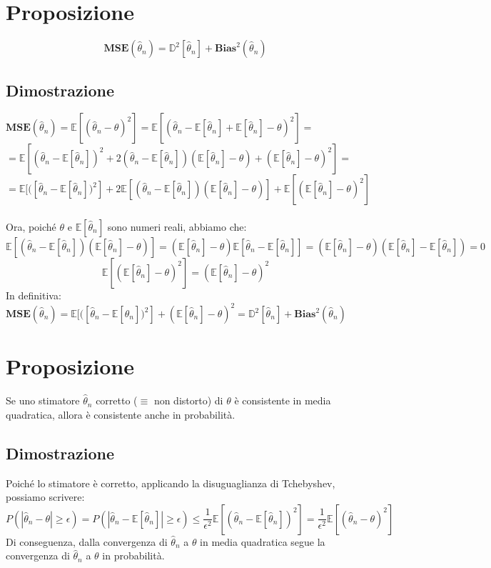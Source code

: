 \documentclass{article}
\begin{document}
\section*{Proposizione}
\[ \textbf{MSE}(\hat{\theta}_{n}) = \mathbb{D}^{2}[\hat{\theta}_{n}] + \textbf{Bias}^{2}(\hat{\theta}_{n}) \]

\subsection*{Dimostrazione}
$\textbf{MSE}(\hat{\theta}_{n}) = \mathbb{E}[(\hat{\theta}_{n} - \theta)^{2}] = \mathbb{E}[(\hat{\theta}_{n} - \mathbb{E}[\hat{\theta}_{n}] + \mathbb{E}[\hat{\theta}_{n}] - \theta)^{2}] =$\\
$=\mathbb{E}[(\hat{\theta}_{n} - \mathbb{E}[\hat{\theta}_{n}])^{2} + 2(\hat{\theta}_{n} - \mathbb{E}[\hat{\theta}_{n}])(\mathbb{E}[\hat{\theta}_{n}] - \theta) + (\mathbb{E}[\hat{\theta}_{n}] - \theta)^{2}] =$\\
$=\mathbb{E}[([\hat{\theta}_{n} - \mathbb{E}[\hat{\theta}_{n}])^{2}] + 2\mathbb{E}[(\hat{\theta}_{n} - \mathbb{E}[\hat{\theta}_{n}])(\mathbb{E}[\hat{\theta}_{n}] - \theta)] + \mathbb{E}[(\mathbb{E}[\hat{\theta}_{n}] - \theta)^{2}]$\\
\\
Ora, poiché $\theta$ e $\mathbb{E}[\hat{\theta}_{n}]$ sono numeri reali, abbiamo che:
\[ \mathbb{E}[(\hat{\theta}_{n} - \mathbb{E}[\hat{\theta}_{n}])(\mathbb{E}[\hat{\theta}_{n}] - \theta)] = (\mathbb{E}[\hat{\theta}_{n}] - \theta)\mathbb{E}[\hat{\theta}_{n} - \mathbb{E}[\hat{\theta}_{n}]] = (\mathbb{E}[\hat{\theta}_{n}] - \theta)(\mathbb{E}[\hat{\theta}_{n}] - \mathbb{E}[\hat{\theta}_{n}]) = 0 \]
\[ \mathbb{E}[(\mathbb{E}[\hat{\theta}_{n}] - \theta)^{2}] = (\mathbb{E}[\hat{\theta}_{n}] - \theta)^{2} \]
In definitiva:\\
$\textbf{MSE}(\hat{\theta}_{n}) = \mathbb{E}[([\hat{\theta}_{n} - \mathbb{E}[\hat{\theta}_{n}])^{2}] + (\mathbb{E}[\hat{\theta}_{n}] - \theta)^{2} = \mathbb{D}^{2}[\hat{\theta}_{n}] + \textbf{Bias}^{2}(\hat{\theta}_{n})$

\section*{Proposizione}
Se uno stimatore $\hat{\theta}_{n}$ corretto ($\equiv$ non distorto) di $\theta$ è consistente in media quadratica, allora è consistente anche in probabilità.

\subsection*{Dimostrazione}
Poiché lo stimatore è corretto, applicando la disuguaglianza di Tchebyshev, possiamo scrivere:
\[ P(|\hat{\theta}_{n} - \theta| \geq \epsilon) = P(|\hat{\theta}_{n} - \mathbb{E}[\hat{\theta}_{n}]| \geq \epsilon) \leq \frac{1}{\epsilon^{2}}\mathbb{E}[(\hat{\theta}_{n} - \mathbb{E}[\hat{\theta}_{n}])^{2}] = \frac{1}{\epsilon^{2}}\mathbb{E}[(\hat{\theta}_{n} - \theta)^{2}] \]
Di conseguenza, dalla convergenza di $\hat{\theta}_{n}$ a $\theta$ in media quadratica segue la convergenza di $\hat{\theta}_{n}$ a $\theta$ in probabilità.
\end{document}
